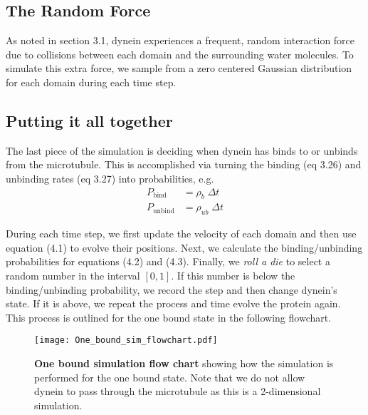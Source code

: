 	\subsection{The Random Force}
	As noted in section 3.1, dynein experiences a frequent, random interaction force due to collisions between each domain and the surrounding water molecules. To simulate this extra force, we sample from a zero centered Gaussian distribution for each domain during each time step. 
	
	\subsection{Putting it all together}
	The last piece of the simulation is deciding when dynein has binds to or unbinds from the microtubule. This is accomplished via turning the binding (eq 3.26) and unbinding rates (eq 3.27) into probabilities, e.g. 
	\begin{align}
		P_{\text{bind}} &= \rho_b\; \Delta t \\ 
		P_{\text{unbind}} &= \rho_{ub}\;\Delta t
	\end{align}
	
	During each time step, we first update the velocity of each domain and then use equation (4.1) to evolve their positions. Next, we calculate the binding/unbinding probabilities for equations (4.2) and (4.3). Finally, we \textit{roll a die} to select a random number in the interval $[0,1]$. If this number is below the binding/unbinding probability, we record the step and then change dynein's state. If it is above, we repeat the process and time evolve the protein again. \\ 
	
	This process is outlined for the one bound state in the following flowchart. 
	
	\begin{figure}[!hbt]
		\centering
		\texttt{[image: One\_bound\_sim\_flowchart.pdf]}
		\caption[One bound simulation flow chart]{\textbf{One bound simulation flow chart} showing how the simulation is performed for the one bound state. Note that we do not allow dynein to pass through the microtubule as this is a 2-dimensional simulation.} 
	\end{figure}
	 
	 \newpage
	 

